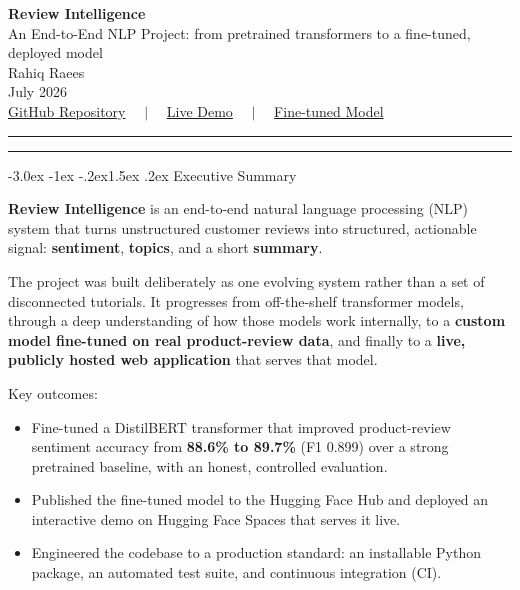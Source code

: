 \documentclass[11pt]{article}
\makeatletter
\renewcommand{\section}{\@startsection{section}{1}{\z@}%
  {-3.0ex \@plus -1ex \@minus -.2ex}{1.5ex \@plus.2ex}%
  {\Large\bfseries\color{primarycolor}}}
\makeatother
\begin{document}
\begin{center}
    {\Huge \bfseries \color{primarycolor} Review Intelligence} \\[4pt]
    {\large An End-to-End NLP Project: from pretrained transformers to a fine-tuned, deployed model} \\[8pt]
    {\large Rahiq Raees} \\[2pt]
    {\normalsize July 2026} \\[6pt]
    \normalsize
    \href{https://github.com/rahiqraees/review-intelligence}{GitHub Repository} $\quad|\quad$
    \href{https://huggingface.co/spaces/rahiqr/review-intelligence}{Live Demo} $\quad|\quad$
    \href{https://huggingface.co/rahiqr/distilbert-amazon-sentiment}{Fine-tuned Model}
\end{center}

\vspace{6pt}
\hrule
\vspace{10pt}

\tableofcontents
\vspace{10pt}
\hrule
\vspace{10pt}

\section{Executive Summary}

\textbf{Review Intelligence} is an end-to-end natural language processing (NLP)
system that turns unstructured customer reviews into structured, actionable
signal: \textbf{sentiment}, \textbf{topics}, and a short \textbf{summary}.

The project was built deliberately as one evolving system rather than a set of
disconnected tutorials. It progresses from off-the-shelf transformer models,
through a deep understanding of how those models work internally, to a
\textbf{custom model fine-tuned on real product-review data}, and finally to a
\textbf{live, publicly hosted web application} that serves that model.

Key outcomes:
\begin{itemize}
    \item Fine-tuned a DistilBERT transformer that improved product-review
    sentiment accuracy from \textbf{88.6\% to 89.7\%} (F1 0.899) over a strong
    pretrained baseline, with an honest, controlled evaluation.
    \item Published the fine-tuned model to the Hugging Face Hub and deployed an
    interactive demo on Hugging Face Spaces that serves it live.
    \item Engineered the codebase to a production standard: an installable
    Python package, an automated test suite, and continuous integration (CI).
\end{itemize}
\end{document}
